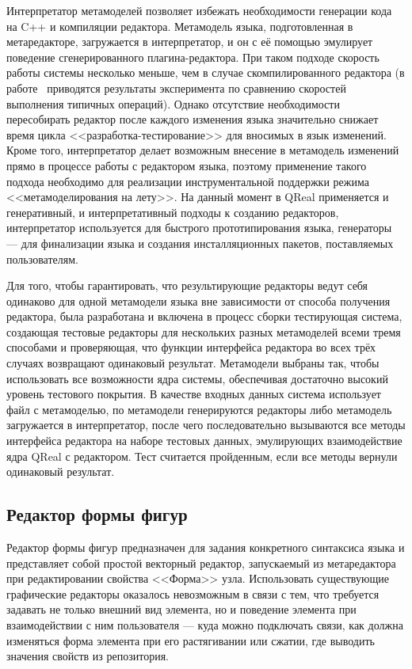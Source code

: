 Интерпретатор метамоделей позволяет избежать необходимости генерации кода на C++ и 
компиляции редактора. Метамодель языка, подготовленная в метаредакторе, загружается 
в интерпретатор, и он с её помощью эмулирует поведение сгенерированного плагина-редактора. 
При таком подходе скорость работы системы несколько меньше, чем в случае скомпилированного 
редактора (в работе~\cite{tarasova2015editors} приводятся результаты эксперимента по сравнению скоростей
выполнения типичных операций). Однако отсутствие необходимости пересобирать редактор после каждого изменения 
языка значительно снижает время цикла <<разработка-тестирование>> для вносимых в язык 
изменений. Кроме того, интерпретатор делает возможным внесение в метамодель изменений 
прямо в процессе работы с редактором языка, поэтому применение такого подхода необходимо 
для реализации инструментальной поддержки режима <<метамоделирования на лету>>.
На данный момент в QReal применяется и генеративный, и интерпретативный подходы к 
созданию редакторов, интерпретатор используется для быстрого прототипирования языка, 
генераторы --- для финализации языка и создания инсталляционных пакетов, поставляемых 
пользователям. 

Для того, чтобы гарантировать, что результирующие редакторы ведут себя 
одинаково для одной метамодели языка вне зависимости от способа получения редактора, 
была разработана и включена в процесс сборки тестирующая система, создающая тестовые 
редакторы для нескольких разных метамоделей всеми тремя способами и проверяющая, что 
функции интерфейса редактора во всех трёх случаях возвращают одинаковый результат.
Метамодели выбраны так, чтобы использовать все возможности ядра системы, обеспечивая 
достаточно высокий уровень тестового покрытия. В качестве входных данных система использует 
файл с метамоделью, по метамодели генерируются редакторы либо метамодель загружается в интерпретатор, 
после чего последовательно вызываются все методы интерфейса редактора на наборе тестовых данных, 
эмулирующих взаимодействие ядра QReal с редактором. Тест считается пройденным, если все методы
вернули одинаковый результат.

\subsection{Редактор формы фигур}
Редактор формы фигур предназначен для задания конкретного синтаксиса языка и представляет 
собой простой векторный редактор, запускаемый из метаредактора при редактировании свойства 
<<Форма>> узла. Использовать существующие графические редакторы оказалось невозможным 
в связи с тем, что требуется задавать не только внешний вид элемента, но и поведение 
элемента при взаимодействии с ним пользователя --- куда можно подключать связи, как 
должна изменяться форма элемента при его растягивании или сжатии, где выводить значения 
свойств из репозитория.

